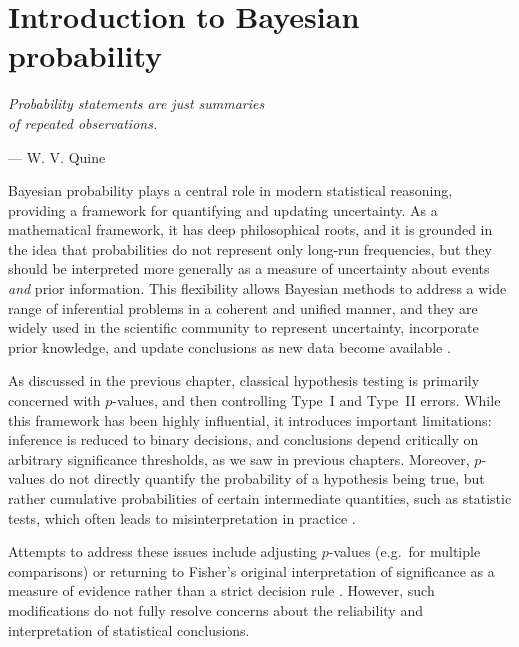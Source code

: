 \chapter{Introduction to Bayesian probability}
\label{chapter6}

\epigraph{\textit{Probability statements are just summaries\\of repeated observations.}}{— W. V. Quine}

Bayesian probability plays a central role in modern statistical reasoning, providing a framework for quantifying and updating uncertainty. As a mathematical framework, it has deep philosophical roots, and it is grounded in the idea that probabilities do not represent only long-run frequencies, but they should be interpreted more generally as a measure of uncertainty about events \textit{and} prior information. This flexibility allows Bayesian methods to address a wide range of inferential problems in a coherent and unified manner, and they are widely used in the scientific community to represent uncertainty, incorporate prior knowledge, and update conclusions as new data become available \cite{degroot_2012_probability, jaynes_2003_logic}.

\medskip

As discussed in the previous chapter, classical hypothesis testing is primarily concerned with \(p\)-values, and then controlling Type~I and Type~II errors. While this framework has been highly influential, it introduces important limitations: inference is reduced to binary decisions, and conclusions depend critically on arbitrary significance thresholds, as we saw in previous chapters. Moreover, $p$-values do not directly quantify the probability of a hypothesis being true, but rather cumulative probabilities of certain intermediate quantities, such as statistic tests, which often leads to misinterpretation in practice \cite{lehmann_1959_testing, cox_2006_principles}.

Attempts to address these issues include adjusting $p$-values (e.g.\ for multiple comparisons) or returning to Fisher’s original interpretation of significance as a measure of evidence rather than a strict decision rule \cite{fisher_1925_statistical, fisher_1935_design}. However, such modifications do not fully resolve concerns about the reliability and interpretation of statistical conclusions.

\medskip

